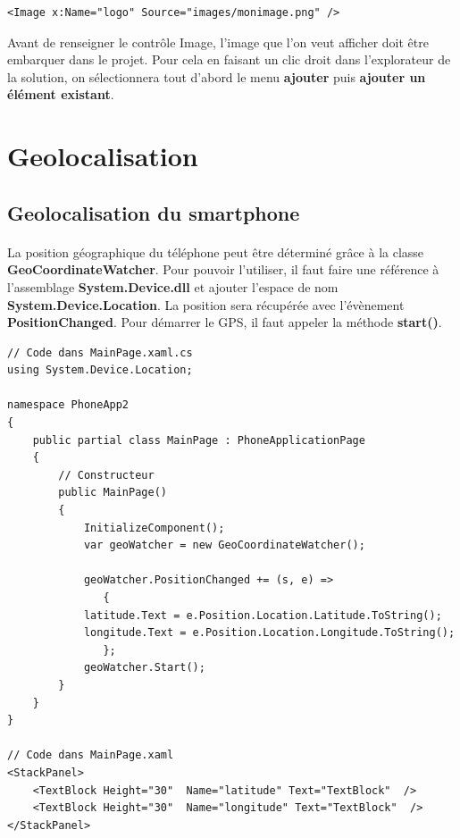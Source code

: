 \documentclass[twoside,UTF8]{EPURapport}
\begin{document}
\begin{lstlisting}[caption={Exemple d'utilisation du contrôle \textbf{Image}}]
	<Image x:Name="logo" Source="images/monimage.png" />	
\end{lstlisting}	

Avant de renseigner le contrôle Image, l'image que l'on veut afficher doit être embarquer dans le projet. Pour cela en faisant un clic droit dans l'explorateur de la solution, on sélectionnera tout d'abord le menu \textbf{ajouter} puis \textbf{ajouter un élément existant}.

	\section{Geolocalisation}
		\subsection{Geolocalisation du smartphone}

\paragraph{}
La position géographique du téléphone peut être déterminé grâce à la classe \textbf{GeoCoordinateWatcher}. Pour pouvoir l'utiliser, il faut faire une référence à l'assemblage \textbf{System.Device.dll} et ajouter l'espace de nom \textbf{System.Device.Location}. La position sera récupérée avec l'évènement \textbf{PositionChanged}. Pour démarrer le GPS, il faut appeler la méthode \textbf{start()}.

\begin{lstlisting}[caption={Affichage des coordonnées du téléphone}]
// Code dans MainPage.xaml.cs
using System.Device.Location;

namespace PhoneApp2
{
    public partial class MainPage : PhoneApplicationPage
    {
        // Constructeur
        public MainPage()
        {
            InitializeComponent();
            var geoWatcher = new GeoCoordinateWatcher();

            geoWatcher.PositionChanged += (s, e) =>
               {
            latitude.Text = e.Position.Location.Latitude.ToString();
            longitude.Text = e.Position.Location.Longitude.ToString();
               };
            geoWatcher.Start();
        }
    }
}

// Code dans MainPage.xaml
<StackPanel>    
	<TextBlock Height="30"  Name="latitude" Text="TextBlock"  />
    <TextBlock Height="30"  Name="longitude" Text="TextBlock"  />
</StackPanel> 

\end{lstlisting}	
\end{document}
